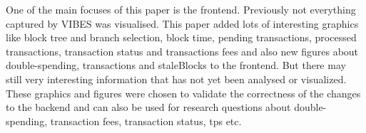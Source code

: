 One of the main focuses of this paper is the frontend. Previously not everything captured by VIBES was visualised. This paper added lots of interesting graphics like block tree and branch selection, block time, pending transactions, processed transactions, transaction status and transactions fees and also new figures about double-spending, transactions and staleBlocks to the frontend. But there may still very interesting information that has not yet been analysed or visualized. These graphics and figures were chosen to validate the correctness of the changes to the backend and can also be used for research questions about double-spending, transaction fees, transaction status, tps etc.